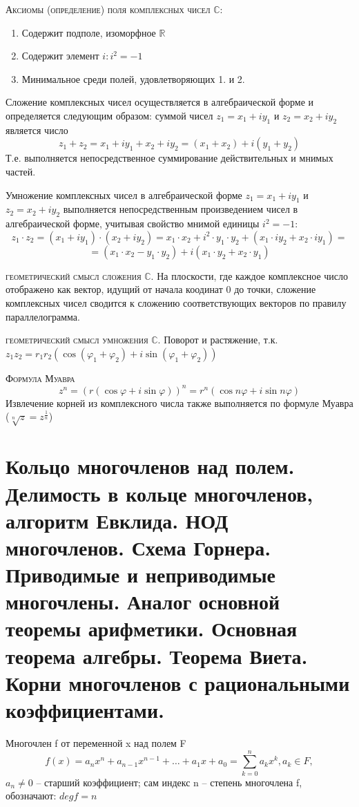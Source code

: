 \documentclass{article}
\begin{document}
\textsc{Аксиомы (определение) поля комплексных чисел $\mathbb{C}$:}
\begin{enumerate}
    \item Содержит подполе, изоморфное $\mathbb{R}$
    \item Содержит элемент $i: i^2=-1$
    \item Минимальное среди полей, удовлетворяющих 1. и 2.
\end{enumerate}

\textsf{Сложение} комплексных чисел осуществляется в алгебраической форме и определяется следующим образом: суммой чисел $z_{1}=x_{1}+iy_{1}$ и $z_{2}=x_{2}+iy_{2}$ является число
\[    z_{1}+z_{2} = x_{1}+iy_{1} + x_{2}+iy_{2} = (x_{1}+x_{2}) + i (y_{1}+y_{2}) \]
Т.е. выполняется непосредственное суммирование действительных и мнимых частей.

\textsf{Умножение} комплексных чисел в алгебраической форме $z_{1}=x_{1}+iy_{1}$ и $z_{2}=x_{2}+iy_{2}$ выполняется непосредственным произведением чисел в алгебраической форме, учитывая свойство мнимой единицы $i^{2}=-1$:
\[    z_{1} \cdot z_{2} = (x_{1}+iy_{1}) \cdot (x_{2}+iy_{2}) = x_{1} \cdot x_{2} + i^{2} \cdot y_{1} \cdot y_{2} + (x_{1} \cdot iy_{2} + x_{2} \cdot iy_{1}) =  \]
\[    = (x_{1} \cdot x_{2} - y_{1} \cdot y_{2}) + i (x_{1} \cdot y_{2} + x_{2} \cdot y_{1}) \]

\textsc{геометрический смысл сложения $\mathbb{C}$.}
На плоскости, где каждое комплексное число  отображено как вектор, идущий от начала коодинат 0 до точки, сложение комплексных чисел сводится к сложению соответствующих векторов по правилу параллелограмма.

\textsc{геометрический смысл умножения $\mathbb{C}$.}
Поворот и растяжение, т.к. $z_1z_2=r_1r_2(\cos({\varphi_1+\varphi_2})+i\sin({\varphi_1+\varphi_2}))$

\textsc{Формула Муавра}
$$z^n=(r(\cos\varphi+i\sin\varphi))^n=r^n(\cos n\varphi+i\sin n\varphi)$$
Извлечение корней из комплексного числа также выполняется по формуле Муавра ($\sqrt[n]{z}=z^{\frac{1}{n}}$)

\section{Кольцо многочленов над полем. Делимость в кольце многочленов, алгоритм Евклида. НОД многочленов. Схема Горнера. Приводимые и неприводимые многочлены. Аналог основной теоремы арифметики. Основная теорема алгебры. Теорема Виета. Корни многочленов с рациональными коэффициентами.}
Многочлен f от переменной x над полем F
$$f(x)=a_nx^n+a_{n-1}x^{n-1}+\dots+a_1x+a_0=\sum^n_{k=0}a_kx^k, a_k\in F,$$
$a_n\neq 0$ – старший коэффициент; сам индекс n – степень многочлена f, обозначают: $deg f=n$
\end{document}
